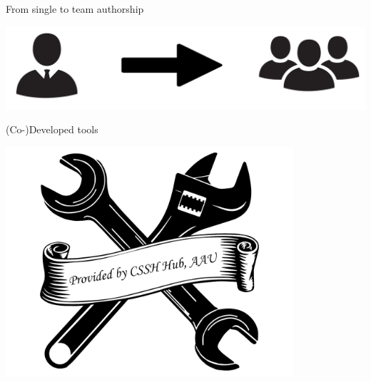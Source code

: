 \documentclass[10pt]{beamer}
\begin{document}
\begin{frame}[fragile]{From single to team authorship}  
    
    \includegraphics[width=\textwidth]{single-multiple}
    \centering

\end{frame}

\begin{frame}{(Co-)Developed tools}

    \includegraphics[width=0.8\textwidth]{tools-cssh}
    \centering
    
\end{frame}
\end{document}
